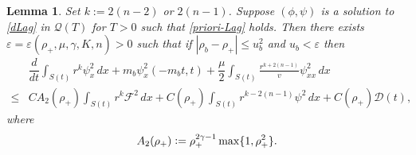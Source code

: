 \documentclass[a4paper,12pt,draft]{article}
\newtheorem{lemma}[theorem]{Lemma}
\theoremstyle{remark}
\def\ep{\varepsilon}
\def\mD{\mathcal{D}}
\def\mF{\mathcal{F}}
\def\mQ{\mathcal{Q}}
\begin{document}
\begin{lemma} \label{lemma:psix}
    Set $k:= 2(n-2)$ or $2(n-1)$. Suppose $(\phi,\psi)$ is a solution to \eqref{dLag} in $\mQ(T)$ for $T>0$ such that \eqref{priori-Lag} holds. Then there exists $\ep=\ep(\rho_+,\mu,\gamma,K,n)>0$ such that if $|\rho_b-\rho_+|\le u_b^2$ and $u_b< \ep$ then
    \begin{align*}
    &\dfrac{d }{d t}\int_{S(t)} r^{k}\psi_x^2 \,d x + m_b \psi_x^2(-m_bt,t) + \dfrac{\mu}{2} \int_{S(t)}\!\!\! \frac{r^{k+2(n-1)}}{v}\psi_{xx}^2 \, d x\\ 
    \le & C A_2(\rho_{+}) \int_{S(t)}\!\!\! r^k \mF^2\,d x + C(\rho_{+}) \int_{S(t)}\!\!\! r^{k-2(n-1)} \psi^2\,d x + C(\rho_{+})\mD(t) , 
    \end{align*}
    where
    \begin{equation}
    A_2(\rho_{+}) \vcentcolon= \rho_{+}^{2\gamma-1} \max\{1,\rho_{+}^2\}.\label{A2}
    \end{equation}
\end{lemma}
\end{document}
